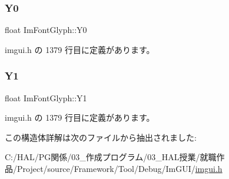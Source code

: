 \subsubsection{\texorpdfstring{Y0}{Y0}}
{\footnotesize\ttfamily float Im\+Font\+Glyph\+::\+Y0}



 imgui.\+h の 1379 行目に定義があります。

\mbox{\label{struct_im_font_glyph_aa6a0440694ae06c4cf03316498327bd2}} 
\subsubsection{\texorpdfstring{Y1}{Y1}}
{\footnotesize\ttfamily float Im\+Font\+Glyph\+::\+Y1}



 imgui.\+h の 1379 行目に定義があります。



この構造体詳解は次のファイルから抽出されました\+:\begin{DoxyCompactItemize}
\item 
C\+:/\+H\+A\+L/\+P\+G関係/03\+\_\+作成プログラム/03\+\_\+\+H\+A\+L授業/就職作品/\+Project/source/\+Framework/\+Tool/\+Debug/\+Im\+G\+U\+I/\mbox{\hyperlink{imgui_8h}{imgui.\+h}}\end{DoxyCompactItemize}
